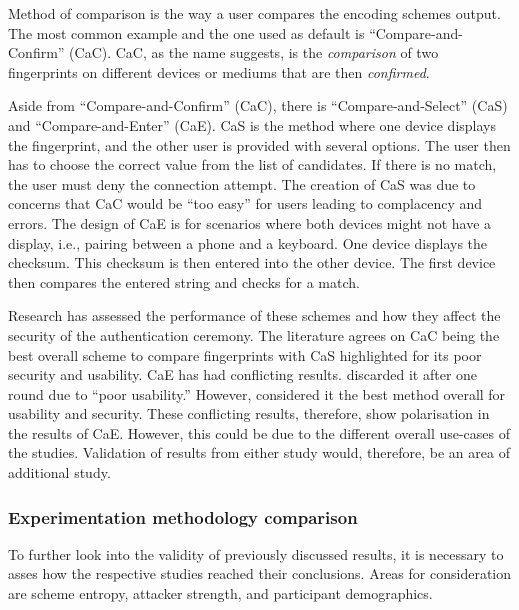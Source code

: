 Method of comparison is the way a user compares the encoding schemes output. The most common example and the one used as default is ``Compare-and-Confirm'' (CaC). CaC, as the name suggests, is the \textit{comparison} of two fingerprints on different devices or mediums that are then \textit{confirmed}. 

Aside from ``Compare-and-Confirm'' (CaC), there is ``Compare-and-Select'' (CaS) and ``Compare-and-Enter'' (CaE). CaS is the method where one device displays the fingerprint, and the other user is provided with several options. The user then has to choose the correct value from the list of candidates. If there is no match, the user must deny the connection attempt. The creation of CaS was due to concerns that CaC would be ``too easy'' for users leading to complacency and errors\cite{uzun2007usability}. The design of CaE is for scenarios where both devices might not have a display, i.e., pairing between a phone and a keyboard. One device displays the checksum. This checksum is then entered into the other device. The first device then compares the entered string and checks for a match.

Research has assessed the performance of these schemes and how they affect the security of the authentication ceremony. The literature agrees on CaC being the best overall scheme to compare fingerprints \cite{tan2017can}\cite{uzun2007usability} with CaS highlighted for its poor security and usability. CaE has had conflicting results. \cite{uzun2007usability} discarded it after one round due to ``poor usability.'' However, \cite{tan2017can} considered it the best method overall for usability and security. These conflicting results, therefore, show polarisation in the results of CaE. However, this could be due to the different overall use-cases of the studies. Validation of results from either study would, therefore, be an area of additional study.

\subsubsection*{Experimentation methodology comparison}
To further look into the validity of previously discussed results, it is necessary to asses how the respective studies reached their conclusions. Areas for consideration are scheme entropy, attacker strength, and participant demographics.

